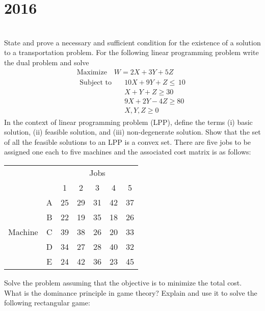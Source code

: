 \section*{2016}
\vspace{-.5cm}
\hrulefill \smallskip\\
 State and prove a necessary and sufficient condition for the existence of a solution to a transportation problem.
\myline
{} For the following linear programming problem write the dual problem and solve 
\begin{gather*}
    \text{Maximize} \quad W = 2X +3Y + 5Z \\
    \begin{aligned}
        \text{Subject to} \quad  &10X + 9Y + Z \leq \, 10 \\
         &X+Y+Z \geq 30 \\
                &9X+2Y -4Z \geq 80 \\
            &X,Y,Z \geq 0
    \end{aligned}
\end{gather*}
 In the context of linear programming problem (LPP), define the terms (i) basic solution, (ii) feasible solution, and (iii) non-degenerate solution. Show that the set of all the feasible solutions to an LPP is a convex set.
\myline
{} There are five jobs to be assigned one each to five machines and the associated cost matrix is as follows:
\begin{table}[!htbp]
\centering
\begin{tabular}{ccccccc}
& & \multicolumn{5}{c}{Jobs} \\
& & 1 & 2 & 3 & 4 & 5\\ \cline{3-7}
\multicolumn{1}{c}{\multirow{5}{*}{Machine}} &
\multicolumn{1}{c|}{A} & 25 & 29 & 31 & 42 & \multicolumn{1}{c|}{37}\\
&\multicolumn{1}{c|}{B} & 22 & 19 & 35 & 18 & \multicolumn{1}{c|}{26}\\
&\multicolumn{1}{c|}{C} & 39 & 38 & 26 & 20 & \multicolumn{1}{c|}{33}\\
&\multicolumn{1}{c|}{D} & 34 & 27 & 28 & 40 & \multicolumn{1}{c|}{32}\\
&\multicolumn{1}{c|}{E} & 24 & 42 & 36 & 23 & \multicolumn{1}{c|}{45}\\
\cline{3-7}
\end{tabular} 
\end{table}
Solve the problem assuming that the objective is to minimize the total cost.
\myline
{} What is the dominance principle in game theory? Explain and use it to solve the following rectangular game:
